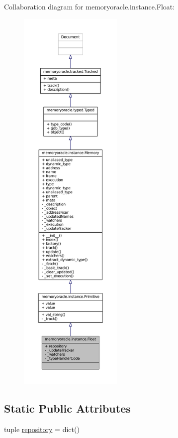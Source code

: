 Collaboration diagram for memoryoracle.\+instance.\+Float\+:
\nopagebreak
\begin{figure}[H]
\begin{center}
\leavevmode
\includegraphics[height=550pt]{classmemoryoracle_1_1instance_1_1Float__coll__graph}
\end{center}
\end{figure}
\subsection*{Static Public Attributes}
\begin{DoxyCompactItemize}
\item 
tuple \hyperlink{classmemoryoracle_1_1instance_1_1Float_a95b3997824e3c9223128f07ef7c69a19}{repository} = dict()
\end{DoxyCompactItemize}
